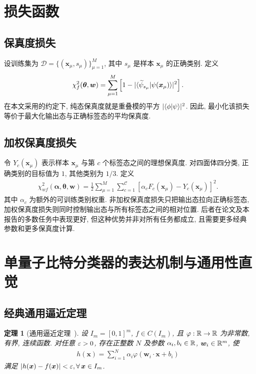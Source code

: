 \documentclass[a4paper]{ctexart}
\newtheorem{theorem}{定理}
\begin{document}
\section{损失函数}

\subsection{保真度损失}

设训练集为 $\mathcal D=\{(\bm{x}_\mu, s_\mu)\}_{\mu=1}^M$, 其中 $s_\mu$ 是样本 $\bm{x}_\mu$ 的正确类别. 定义
\begin{align}
    \chi_f^2(\bm{\theta}, \bm{w})=\sum_{\mu=1}^M\left[1-\lvert\braket{\widetilde{\psi}_{s_\mu}|\psi(\bm{x}_\mu)}\rvert^2\right].
\end{align}
在本文采用的约定下, 纯态保真度就是重叠模的平方 $\lvert\braket{\phi|\psi}\rvert^2$. 因此, 最小化该损失等价于最大化输出态与正确标签态的平均保真度.

\subsection{加权保真度损失}

令 $Y_c(\bm{x}_\mu)$ 表示样本 $\bm{x}_\mu$ 与第 $c$ 个标签态之间的理想保真度. 对四面体四分类, 正确类别的目标值为 $1$, 其他类别为 $1/3$. 定义
\begin{align}
    \chi_{wf}^2(\bm{\alpha}, \bm{\theta}, \bm{w})=\frac{1}{2}\sum_{\mu=1}^M \sum_{c=1}^{\mathcal C}\left[\alpha_c F_c(\bm{x}_\mu)-Y_c(\bm{x}_\mu)\right]^2.
\end{align}
其中 $\alpha_c$ 为额外的可训练类别权重. 非加权保真度损失只把输出态拉向正确标签态, 加权保真度损失则同时控制输出态与所有标签态之间的相对位置. 后者在论文及本报告的多数任务中表现更好, 但这种优势并非对所有任务都成立, 且需要更多经典参数和更多保真度计算.

\section{单量子比特分类器的表达机制与通用性直觉}

\subsection{经典通用逼近定理}

\begin{theorem}[通用逼近定理~\cite{hornik1991}]
    设 $I_m=[0, 1]^m$, $f\in C(I_m)$, 且 $\varphi: \mathbb{R}\to\mathbb{R}$ 为非常数, 有界, 连续函数. 对任意 $\varepsilon>0$, 存在正整数 $N$ 及参数 $\alpha_i, b_i\in\mathbb{R}$, $\bm{w}_i\in\mathbb{R}^m$, 使
    \begin{align}
        h(\bm{x})=\sum_{i=1}^N\alpha_i\varphi(\bm{w}_i\cdot\bm{x}+b_i)
    \end{align}
    满足 $\lvert h(\bm{x})-f(\bm{x})\rvert<\varepsilon, \forall\, \bm{x}\in I_m$.
\end{theorem}
\end{document}
